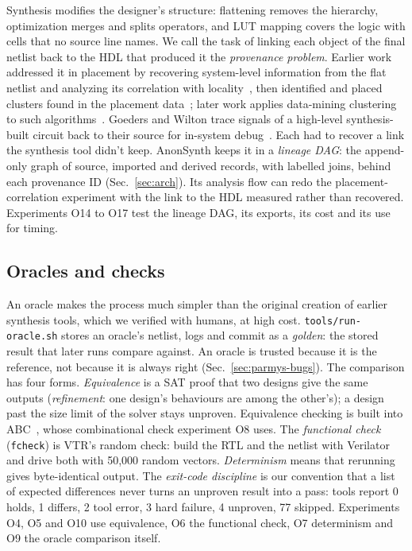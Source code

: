 \documentclass[conference]{IEEEtran}
\newcommand{\code}[1]{\texttt{#1}}
\begin{document}
Synthesis modifies the designer's structure: flattening removes the hierarchy, optimization merges and splits operators, and LUT mapping covers the logic with cells that no source line names. We call the task of linking each object of the final netlist back to the HDL that produced it the \emph{provenance problem}. Earlier work addressed it in placement by recovering system-level information from the flat netlist and analyzing its correlation with locality~\cite{anon04,anon05}, then identified and placed clusters found in the placement data~\cite{anon06}; later work applies data-mining clustering to such algorithms~\cite{anon07}. Goeders and Wilton trace signals of a high-level synthesis-built circuit back to their source for in-system debug~\cite{goeders2014effective,goeders2015dynamic,goeders2017signaltracing}. Each had to recover a link the synthesis tool didn't keep. AnonSynth keeps it in a \emph{lineage DAG}: the append-only graph of source, imported and derived records, with labelled joins, behind each provenance ID (Sec.~\ref{sec:arch}). %
Its analysis flow can redo the placement-correlation experiment with the link to the HDL measured rather than recovered. Experiments O14 to O17 test the lineage DAG, its exports, its cost and its use for timing.

\subsection{Oracles and checks}

An oracle makes the process much simpler than the original creation of earlier synthesis tools, which we verified with humans, at high cost. \code{tools/run-oracle.sh} stores an oracle's netlist, logs and commit as a \emph{golden}: the stored result that later runs compare against. %
An oracle is trusted because it is the reference, not because it is always right (Sec.~\ref{sec:parmys-bugs}). The comparison has four forms. \emph{Equivalence} is a SAT proof that two designs give the same outputs (\emph{refinement}: one design's behaviours are among the other's); a design past the size limit of the solver stays unproven. %
Equivalence checking is built into ABC~\cite{mishchenko2005fraigs,brayton2010abc}, whose combinational check experiment O8 uses. The \emph{functional check} (\code{fcheck}) is VTR's random check: build the RTL and the netlist with Verilator~\cite{verilator} and drive both with 50,000 random vectors. %
\emph{Determinism} means that rerunning gives byte-identical output. %
The \emph{exit-code discipline} is our convention that a list of expected differences never turns an unproven result into a pass: tools report 0 holds, 1 differs, 2 tool error, 3 hard failure, 4 unproven, 77 skipped. %
Experiments O4, O5 and O10 use equivalence, O6 the functional check, O7 determinism and O9 the oracle comparison itself.
\end{document}
